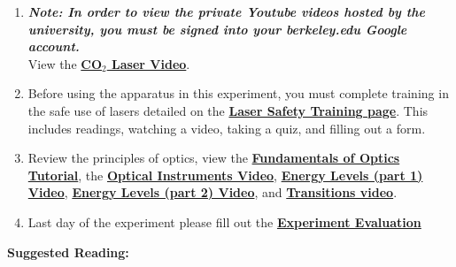 \documentclass{../lab}
\begin{document}
\begin{enumerate}
    \item \emph{\textbf{Note: In order to view the private Youtube videos hosted by the university, you must be signed into your berkeley.edu Google account.}} \\
    View the \href{http://youtu.be/-cLSnuXGC\_U}{\textbf{CO$_2$ Laser Video}}.

    \item Before using the apparatus in this experiment, you must complete training in the safe use of lasers detailed on the \href{https://berkeley-physics111b.github.io/safety/laser/}{\textbf{\textbf{Laser Safety Training page}}}. This includes readings, watching a video, taking a quiz, and filling out a form.

    \item Review the principles of optics, view the \href{https://berkeley-physics111b.github.io/assets/pdf/oldwebsitestructure/QIE/fundamental-Optics.pdf}{\textbf{Fundamentals of Optics Tutorial}}, the \href{http://youtu.be/zUGBt5vc5FA}{\textbf{Optical Instruments Video}}, \href{http://youtu.be/wyBOVjU5bBQ}{\textbf{Energy Levels (part 1) Video}}, \href{http://youtu.be/Eypw0DmVBxk}{\textbf{Energy Levels (part 2) Video}}, and \href{http://youtu.be/xOMgdVP3AfE}{\textbf{Transitions video}}.

    \item Last day of the experiment please fill out the \href{\ExperimentEvaluation}{\textbf{Experiment Evaluation}}

\end{enumerate}

\noindent\textbf{Suggested Reading:}
\end{document}

